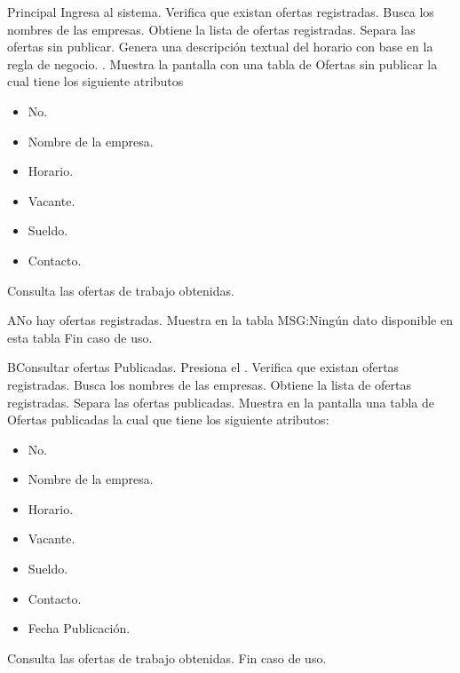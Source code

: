 	\begin{UCtrayectoria}{Principal}
	\UCpaso[\UCactor] Ingresa al sistema.
	\UCpaso Verifica que existan ofertas registradas.
	\UCpaso Busca los nombres de las empresas. 
	\UCpaso Obtiene la lista de ofertas registradas.
	\UCpaso Separa las ofertas sin publicar.	
	\UCpaso Genera una descripción textual del horario con base en la regla de negocio. .
	\UCpaso Muestra la pantalla   con una tabla de Ofertas sin publicar la cual  tiene los siguiente atributos
	\begin{itemize}
	\item No.
	\item Nombre de la empresa.
	\item Horario.
	\item Vacante.
	\item Sueldo.
	\item Contacto.
	\end{itemize}
	\UCpaso[\UCactor] Consulta las ofertas de trabajo obtenidas. 
	\end{UCtrayectoria}

\begin{UCtrayectoriaA}{A}{No hay ofertas registradas.}
	\UCpaso Muestra en la tabla MSG:Ningún dato disponible en esta tabla
	\UCpaso Fin caso de uso.
\end{UCtrayectoriaA}

\begin{UCtrayectoriaB}{B}{Consultar ofertas Publicadas.}
	\UCpaso[\UCactor] Presiona el .
	\UCpaso Verifica que existan ofertas registradas.
	\UCpaso Busca los nombres de las empresas. 
	\UCpaso Obtiene la lista de ofertas registradas.
	\UCpaso Separa las ofertas publicadas.	
	\UCpaso Muestra en la pantalla    una tabla de Ofertas publicadas la cual que tiene los siguiente atributos:
	\begin{itemize}
	\item No.
	\item Nombre de la empresa.
	\item Horario.
	\item Vacante.
	\item Sueldo.
	\item Contacto.
	\item Fecha Publicación.
	\end{itemize}
	\UCpaso[\UCactor] Consulta las ofertas de trabajo obtenidas.
	\UCpaso Fin caso de uso.
\end{UCtrayectoriaB}


	
